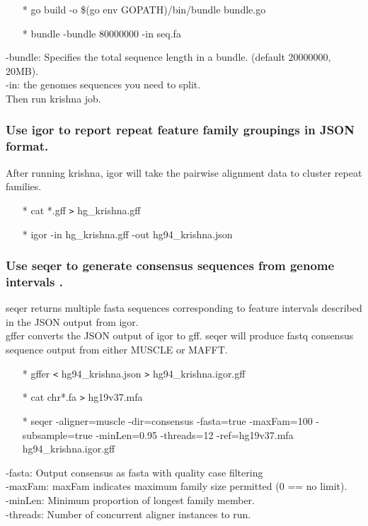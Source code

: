 \documentclass[12pt]{report}
\begin{document}
\begin{enumerate}
	\item[*] go build -o \$(go env GOPATH)/bin/bundle bundle.go
	\item[*] bundle -bundle 80000000 -in seq.fa
\end{enumerate}

\noindent -bundle: Specifies the total sequence length in a bundle. (default 20000000, 20MB).\\
-in: the genomes sequences you need to split.\\
Then run krishna job.\\

\subsubsection{Use igor to report repeat feature family groupings in JSON format.}

After running krishna, igor will take the pairwise alignment data to cluster repeat families.
\begin{enumerate}
	\item[*] cat *.gff \texttt{>} hg\_krishna.gff
	\item[*] igor -in hg\_krishna.gff -out hg94\_krishna.json
\end{enumerate}

\subsubsection{Use seqer to generate consensus sequences from genome intervals .}
seqer returns multiple fasta sequences corresponding to feature intervals described in the JSON output from igor. \\

gffer converts the JSON output of igor to gff. seqer will produce fastq consensus sequence output from either MUSCLE or MAFFT. 

\begin{enumerate}
	\item[*] gffer \texttt{<} hg94\_krishna.json \texttt{>} hg94\_krishna.igor.gff
	\item[*] cat chr*.fa \texttt{>} hg19v37.mfa
	\item[*] seqer -aligner=muscle -dir=consensus -fasta=true -maxFam=100 -subsample=true -minLen=0.95 -threads=12 -ref=hg19v37.mfa hg94\_krishna.igor.gff
\end{enumerate}

\noindent -fasta: Output consensus as fasta with quality case filtering\\
-maxFam: maxFam indicates maximum family size permitted (0 == no limit).\\
-minLen: Minimum proportion of longest family member.\\
-threads: Number of concurrent aligner instances to run.
\end{document}
